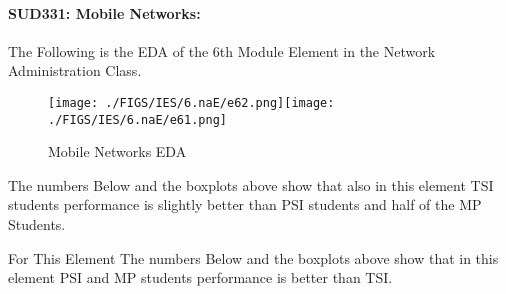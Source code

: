 \documentclass[12pt]{extreport}
\begin{document}

\paragraph{\large SUD331: Mobile Networks:\\
} 
The Following is the EDA of the 6th Module Element in the Network Administration Class.

\begin{figure}[H]
	\centering
	\texttt{[image: ./FIGS/IES/6.naE/e62.png]}\texttt{[image: ./FIGS/IES/6.naE/e61.png]}
	\caption{Mobile Networks EDA}
	\label{fig:77}
\end{figure}

The numbers Below and the boxplots above show that also in this element  TSI students performance is slightly better than PSI students and half of the MP Students.

For This Element The numbers Below and the boxplots above show that in this element  PSI and MP students performance is  better than TSI.
\end{document}
